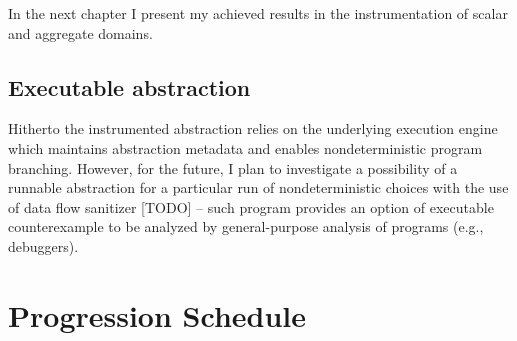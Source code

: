 In the next chapter I present my achieved results in the instrumentation of scalar and aggregate domains.



\subsection{ Executable abstraction }

Hitherto the instrumented abstraction relies on the underlying execution engine
which maintains abstraction metadata and enables nondeterministic program
branching. However, for the future, I plan to investigate a possibility of a
runnable abstraction for a particular run of nondeterministic choices with the
use of data flow sanitizer [TODO] -- such program provides an option of
executable counterexample to be analyzed by general-purpose analysis of \llvm
programs (e.g., debuggers).

\section{Progression Schedule}

